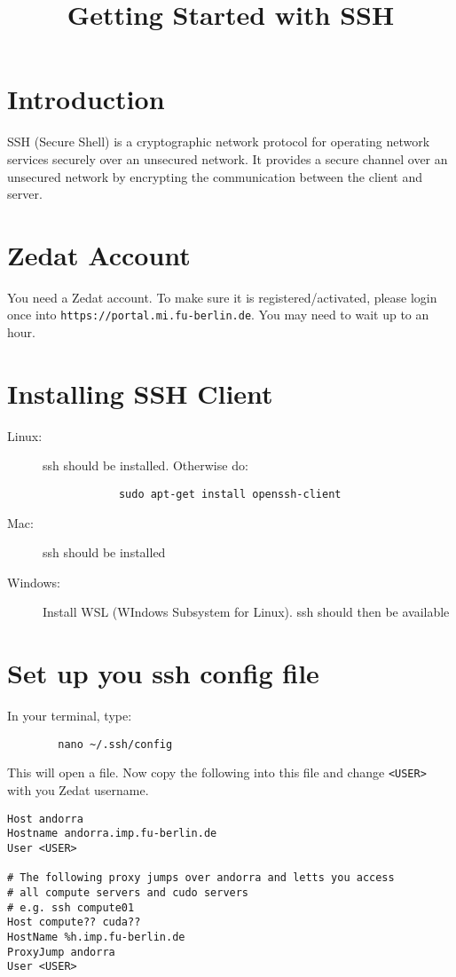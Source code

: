 \documentclass{article}
\title{Getting Started with SSH}
\date{}
\begin{document}
	
	\maketitle
	
	\section{Introduction}
	SSH (Secure Shell) is a cryptographic network protocol for operating network services securely over an unsecured network. It provides a secure channel over an unsecured network by encrypting the communication between the client and server. 
	
	\section{Zedat Account}
	
	You need a Zedat account. To make sure it is registered/activated, please login once into \verb|https://portal.mi.fu-berlin.de|. You may need to wait up to an hour.
	
	\section{Installing SSH Client}
	
	\begin{description}
		\item[Linux:] ssh should be installed. Otherwise do: \begin{verbatim}
			sudo apt-get install openssh-client
		\end{verbatim}
		\item[Mac:] ssh should be installed
		\item[Windows: ] Install WSL (WIndows Subsystem for Linux). ssh should then be available
	\end{description}
	
	\section{Set up you ssh config file}
	
	In your terminal, type:
	\begin{verbatim}
		nano ~/.ssh/config
	\end{verbatim}

	This will open a file. Now copy the following into this file and change \verb|<USER>| with you Zedat username.
	
	\begin{verbatim}
Host andorra
Hostname andorra.imp.fu-berlin.de
User <USER>

# The following proxy jumps over andorra and letts you access
# all compute servers and cudo servers
# e.g. ssh compute01
Host compute?? cuda??
HostName %h.imp.fu-berlin.de
ProxyJump andorra
User <USER>

	\end{verbatim}
	
\end{document}
